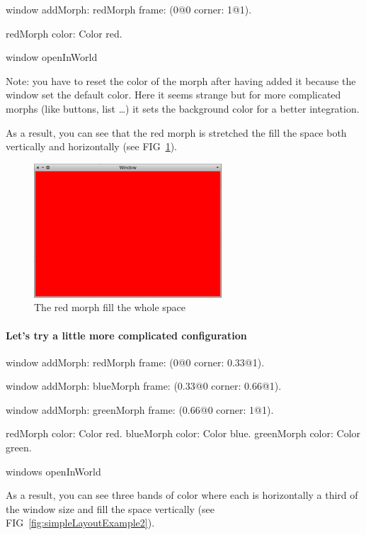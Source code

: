 \documentclass[a4paper,10pt,twoside]{book}
\begin{document}
\begin{code}{}
window
	addMorph: redMorph
	frame: (0@0 corner: 1@1).
	
redMorph color: Color red.	
	
window openInWorld
\end{code}
Note: you have to reset the color of the morph after having added it because the window set the default color. Here it seems strange but for more complicated morphs (like buttons, list \dots) it sets the background color for a better integration.

As a result, you can see that the red morph is stretched the fill the space both vertically and horizontally (see FIG~\ref{fig:simpleLayoutExample1}).

\begin{figure}[ht]\centering
	\includegraphics[width=7cm]{SimpleLayoutExample1}
	\caption{The red morph fill the whole space}
	\label{fig:simpleLayoutExample1}
\end{figure}

\paragraph{Let's try a little more complicated configuration}

\begin{code}{}
window
	addMorph: redMorph
	frame: (0@0 corner: 0.33@1).

window
	addMorph: blueMorph
	frame: (0.33@0 corner: 0.66@1).

window
	addMorph: greenMorph
	frame: (0.66@0 corner: 1@1).

redMorph color: Color red.
blueMorph color: Color blue.
greenMorph color: Color green.

windows openInWorld
\end{code}

As a result, you can see three bands of color where each is horizontally a third of the window size and fill the space vertically (see FIG~\ref{fig:simpleLayoutExample2}).
\end{document}
